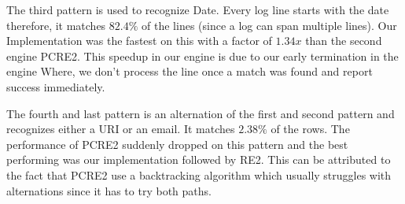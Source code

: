The third pattern is used to recognize Date. Every log line starts with the date therefore, it matches $82.4\%$ of the lines (since a log can span multiple lines). Our Implementation was the fastest on this with a factor of $1.34x$ than the second engine PCRE2. This speedup in our engine is due to our early termination in the engine Where, we don't process the line once a match was found and report success immediately.

The fourth and last pattern is an alternation of the first and second pattern and recognizes either a URI or an email. It matches $2.38\%$ of the rows. The performance of PCRE2 suddenly dropped on this pattern and the best performing was our implementation followed by RE2. This can be attributed to the fact that PCRE2 use a backtracking algorithm which usually struggles with alternations since it has to try both paths.



